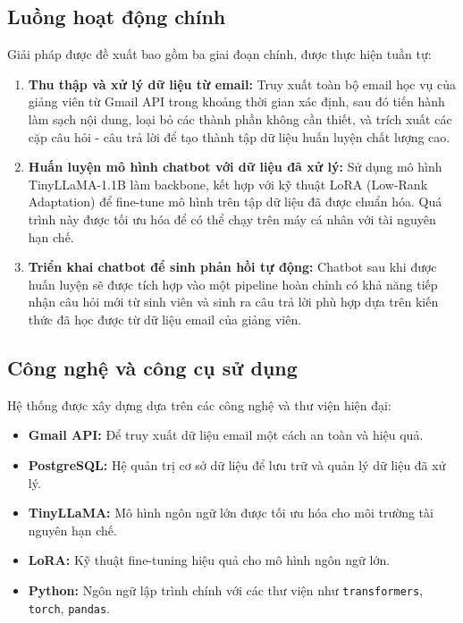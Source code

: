 \documentclass[../DoAn.tex]{subfiles}
\begin{document}
\subsection{Luồng hoạt động chính}
Giải pháp được đề xuất bao gồm ba giai đoạn chính, được thực hiện tuần tự:
\begin{enumerate}
    \item \textbf{Thu thập và xử lý dữ liệu từ email:} Truy xuất toàn bộ email học vụ của giảng viên từ Gmail API trong khoảng thời gian xác định, sau đó tiến hành làm sạch nội dung, loại bỏ các thành phần không cần thiết, và trích xuất các cặp câu hỏi - câu trả lời để tạo thành tập dữ liệu huấn luyện chất lượng cao.
    \item \textbf{Huấn luyện mô hình chatbot với dữ liệu đã xử lý:} Sử dụng mô hình TinyLLaMA-1.1B làm backbone, kết hợp với kỹ thuật LoRA (Low-Rank Adaptation) để fine-tune mô hình trên tập dữ liệu đã được chuẩn hóa. Quá trình này được tối ưu hóa để có thể chạy trên máy cá nhân với tài nguyên hạn chế.
    \item \textbf{Triển khai chatbot để sinh phản hồi tự động:} Chatbot sau khi được huấn luyện sẽ được tích hợp vào một pipeline hoàn chỉnh có khả năng tiếp nhận câu hỏi mới từ sinh viên và sinh ra câu trả lời phù hợp dựa trên kiến thức đã học được từ dữ liệu email của giảng viên.
\end{enumerate}

\subsection{Công nghệ và công cụ sử dụng}
Hệ thống được xây dựng dựa trên các công nghệ và thư viện hiện đại:
\begin{itemize}
    \item \textbf{Gmail API:} Để truy xuất dữ liệu email một cách an toàn và hiệu quả.
    \item \textbf{PostgreSQL:} Hệ quản trị cơ sở dữ liệu để lưu trữ và quản lý dữ liệu đã xử lý.
    \item \textbf{TinyLLaMA:} Mô hình ngôn ngữ lớn được tối ưu hóa cho môi trường tài nguyên hạn chế.
    \item \textbf{LoRA:} Kỹ thuật fine-tuning hiệu quả cho mô hình ngôn ngữ lớn.
    \item \textbf{Python:} Ngôn ngữ lập trình chính với các thư viện như \texttt{transformers}, \texttt{torch}, \texttt{pandas}.
\end{itemize}
\end{document}
